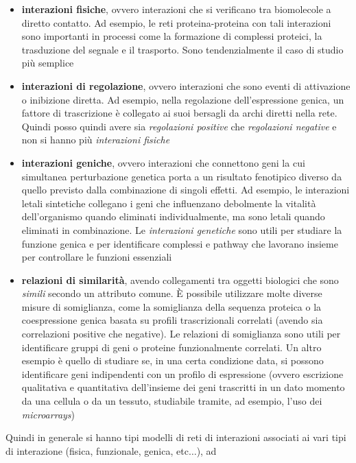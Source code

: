 \documentclass[a4paper,12pt, oneside]{book}
\begin{document}
\begin{itemize}
  \item \textbf{interazioni fisiche}, ovvero interazioni che si verificano tra
  biomolecole a diretto contatto. Ad esempio, le reti proteina-proteina
  con tali interazioni sono importanti in processi come la formazione di
  complessi proteici, la trasduzione del segnale e il trasporto. Sono
  tendenzialmente il caso di studio più semplice
  \item \textbf{interazioni di regolazione}, ovvero interazioni che sono eventi
  di attivazione o inibizione diretta. Ad esempio, nella regolazione
  dell'espressione genica, un fattore di trascrizione è collegato ai suoi
  bersagli da archi diretti nella rete. Quindi posso quindi avere sia
  \textit{regolazioni positive} che \textit{regolazioni negative} e non si hanno
  più \textit{interazioni fisiche}
  \item \textbf{interazioni geniche}, ovvero interazioni che connettono geni la
  cui simultanea perturbazione genetica porta a un risultato fenotipico diverso
  da quello previsto dalla combinazione di singoli effetti. Ad esempio, le
  interazioni letali sintetiche collegano i geni che influenzano debolmente la
  vitalità dell'organismo quando eliminati individualmente, ma sono letali
  quando eliminati in combinazione. Le \textit{interazioni genetiche} sono utili
  per studiare la funzione genica e per identificare complessi e pathway che
  lavorano insieme per controllare le funzioni essenziali  
  \item \textbf{relazioni di similarità}, avendo collegamenti tra oggetti
  biologici che sono \textit{simili} secondo un attributo comune. È possibile
  utilizzare molte diverse misure di somiglianza, come la somiglianza della
  sequenza proteica o la coespressione genica basata su profili trascrizionali
  correlati (avendo sia correlazioni positive che negative). Le relazioni di
  somiglianza sono utili per identificare gruppi di geni o proteine
  funzionalmente correlati. Un altro esempio è quello di studiare se, in una
  certa condizione data, si possono identificare geni indipendenti con un
  profilo di espressione (ovvero escrizione qualitativa e quantitativa
  dell’insieme dei geni trascritti in un dato momento da una cellula o da un
  tessuto, studiabile tramite, ad esempio, l'uso dei
  \textit{microarrays})
\end{itemize}
Quindi in generale si hanno tipi modelli di reti di interazioni associati ai
vari tipi di interazione (fisica, funzionale, genica, etc$\ldots$), ad
\end{document}
